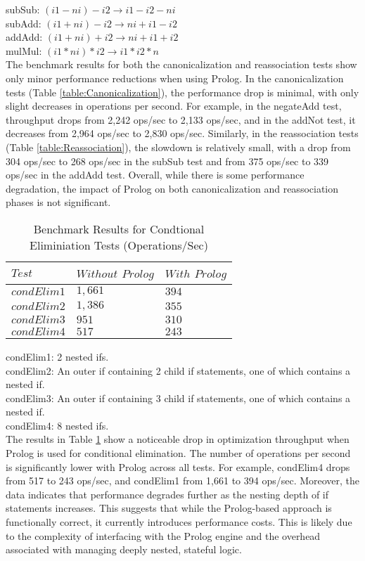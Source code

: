 \noindent subSub: $(i1 - ni) - i2 \rightarrow i1 - i2 - ni$\\
subAdd: $(i1 + ni) - i2 \rightarrow ni + i1 - i2$\\
addAdd: $(i1 + ni) + i2 \rightarrow ni + i1 + i2$\\
mulMul: $(i1 * ni) * i2 \rightarrow i1 * i2 * n$\\


The benchmark results for both the canonicalization and reassociation tests show only minor performance reductions when using Prolog. 
In the canonicalization tests (Table \ref{table:Canonicalization}), the performance drop is minimal, with only slight decreases in operations per second. 
For example, in the negateAdd test, throughput drops from 2,242 ops/sec to 2,133 ops/sec, and in the addNot test, it decreases from 2,964 ops/sec to 2,830 ops/sec. 
Similarly, in the reassociation tests (Table \ref{table:Reassociation}), the slowdown is relatively small, with a drop from 304 ops/sec to 268 ops/sec in the subSub test and from 375 ops/sec to 339 ops/sec in the addAdd test.
Overall, while there is some performance degradation, the impact of Prolog on both canonicalization and reassociation phases is not significant.

\begin{table}[h]
    \centering
    \fontsize{9pt}{9pt}
    \begin{tabular}{|l|l|l|}
        \hline
        $Test$ & $Without$ $Prolog$ & $With$ $Prolog$ \\
        \hline
        $condElim1$ & $1,661$ & $394$ \\
        $condElim2$ & $1,386$ & $355$ \\
        $condElim3$ & $951$ & $310$ \\
        $condElim4$ & $517$ & $243$ \\
        \hline
    \end{tabular}
    \caption{Benchmark Results for Condtional Eliminiation Tests (Operations/Sec)}
    \label{table:condElimination}
\end{table} 
\smallbreak

\noindent condElim1: 2 nested ifs.\\
condElim2: An outer if containing 2 child if statements, one of which contains a nested if.\\
condElim3: An outer if containing 3 child if statements, one of which contains a nested if.\\
condElim4: 8 nested ifs.\\

The results in Table \ref{table:condElimination} show a noticeable drop in optimization throughput when Prolog is used for conditional elimination. 
The number of operations per second is significantly lower with Prolog across all tests. 
For example, condElim4 drops from 517 to 243 ops/sec, and condElim1 from 1,661 to 394 ops/sec.
Moreover, the data indicates that performance degrades further as the nesting depth of if statements increases. 
This suggests that while the Prolog-based approach is functionally correct, it currently introduces performance costs. This is likely due to the complexity of interfacing with the Prolog engine and the overhead associated with managing deeply nested, stateful logic.
